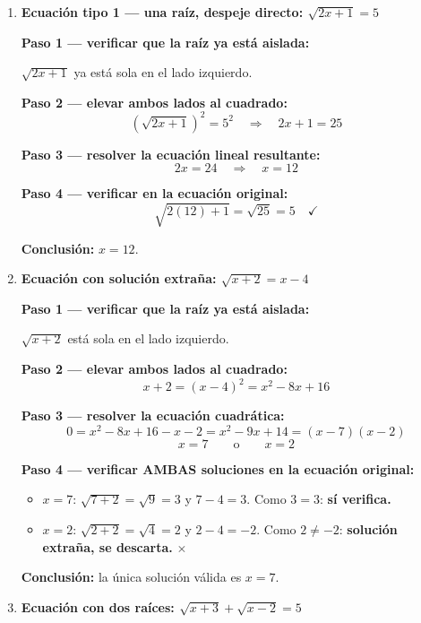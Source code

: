 \documentclass[11pt, letterpaper]{article}
\begin{document}
\begin{tcolorbox}[examplebox, title={Ejemplos resueltos}]
\begin{enumerate}[label=\textbf{Ej. \arabic*.}, leftmargin=*, itemsep=18pt]

\item \textbf{Ecuación tipo 1 — una raíz, despeje directo: $\sqrt{2x+1}=5$}

\textbf{Paso 1 — verificar que la raíz ya está aislada:}

$\sqrt{2x+1}$ ya está sola en el lado izquierdo.

\textbf{Paso 2 — elevar ambos lados al cuadrado:}
$$\left(\sqrt{2x+1}\right)^2 = 5^2 \quad\Longrightarrow\quad 2x+1 = 25$$

\textbf{Paso 3 — resolver la ecuación lineal resultante:}
$$2x = 24 \quad\Longrightarrow\quad x = 12$$

\textbf{Paso 4 — verificar en la ecuación original:}
$$\sqrt{2(12)+1} = \sqrt{25} = 5 \quad\checkmark$$

\textbf{Conclusión:} $x = 12$.

\item \textbf{Ecuación con solución extraña: $\sqrt{x+2} = x-4$}

\textbf{Paso 1 — verificar que la raíz ya está aislada:}

$\sqrt{x+2}$ está sola en el lado izquierdo.

\textbf{Paso 2 — elevar ambos lados al cuadrado:}
$$x+2 = (x-4)^2 = x^2-8x+16$$

\textbf{Paso 3 — resolver la ecuación cuadrática:}
$$0 = x^2-8x+16-x-2 = x^2-9x+14 = (x-7)(x-2)$$
$$x = 7 \qquad\text{o}\qquad x = 2$$

\textbf{Paso 4 — verificar AMBAS soluciones en la ecuación original:}

\begin{itemize}[itemsep=3pt]
  \item $x=7$: $\sqrt{7+2} = \sqrt{9} = 3$ y $7-4=3$. Como $3=3$: \textbf{sí verifica.} \checkmark
  \item $x=2$: $\sqrt{2+2} = \sqrt{4} = 2$ y $2-4=-2$. Como $2 \neq -2$: \textbf{solución extraña, se descarta.} $\times$
\end{itemize}

\textbf{Conclusión:} la única solución válida es $x = 7$.

\item \textbf{Ecuación con dos raíces: $\sqrt{x+3}+\sqrt{x-2}=5$}


\end{enumerate}
\end{tcolorbox}
\end{document}
